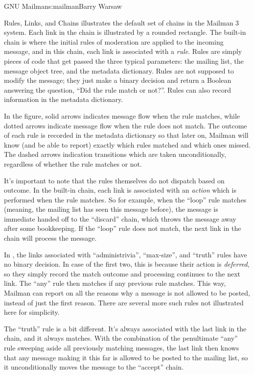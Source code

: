 \begin{aosachapter}{GNU Mailman}{s:mailman}{Barry Warsaw}
\begin{aosasect1}{Rules, Links, and Chains}
 illustrates the default set of chains
in the Mailman 3 system.  Each link in the chain is illustrated by a
rounded rectangle.  The built-in chain is where the initial rules of
moderation are applied to the incoming message, and in this chain,
each link is associated with a \emph{rule}.  Rules are simply pieces
of code that get passed the three typical parameters: the mailing
list, the message object tree, and the metadata dictionary.  Rules are
not supposed to modify the message; they just make a binary decision
and return a Boolean answering the question, ``Did the rule match or
not?''.  Rules can also record information in the metadata dictionary.

In the figure, solid arrows indicates message flow when the rule
matches, while dotted arrows indicate message flow when the rule does not
match.  The outcome of each rule is recorded in the metadata
dictionary so that later on, Mailman will know (and be able to report)
exactly which rules matched and which ones missed.  The dashed arrows
indication transitions which are taken unconditionally, regardless of
whether the rule matches or not.


It's important to note that the rules themselves do not dispatch based
on outcome.  In the built-in chain, each link is associated with an
\emph{action} which is performed when the rule matches.  So for
example, when the ``loop'' rule matches (meaning, the mailing list has
seen this message before), the message is immediate handed off to the
``discard'' chain, which throws the message away after some
bookkeeping.  If the ``loop'' rule does not match, the next link in
the chain will process the message.

In , the links associated with
``administrivia'', ``max-size'', and ``truth'' rules have no binary
decision.  In case of the first two, this is because their action is
\emph{deferred}, so they simply record the match outcome and
processing continues to the next link.  The ``any'' rule then matches
if any previous rule matches.  This way, Mailman can report on all the
reasons why a message is not allowed to be posted, instead of just the
first reason.  There are several more such rules not illustrated here
for simplicity.

The ``truth'' rule is a bit different.  It's always associated with
the last link in the chain, and it always matches.  With the
combination of the penultimate ``any'' rule sweeping aside all
previously matching messages, the last link then knows that any
message making it this far is allowed to be posted to the
mailing list, so it unconditionally moves the message to the
``accept'' chain.


\end{aosasect1}
\end{aosachapter}
